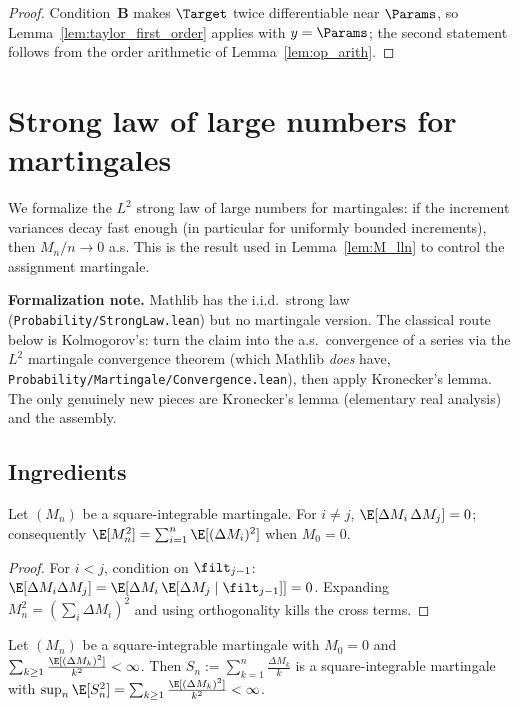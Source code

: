 \begin{proof}
Condition~\textbf{B} makes $\Target$ twice differentiable near $\Params$, so
Lemma~\ref{lem:taylor_first_order} applies with $y = \Params$; the second
statement follows from the order arithmetic of Lemma~\ref{lem:op_arith}.
\end{proof}


\chapter{Strong law of large numbers for martingales}
\label{chap:pre_slln}

We formalize the $L^2$ strong law of large numbers for martingales: if the
increment variances decay fast enough (in particular for uniformly bounded
increments), then $M_n / n \to 0$ a.s. This is the result used in
Lemma~\ref{lem:M_lln} to control the assignment martingale.

\textbf{Formalization note.} Mathlib has the i.i.d.\ strong law
(\texttt{Probability/StrongLaw.lean}) but no martingale version. The classical
route below is Kolmogorov's: turn the claim into the a.s.\ convergence of a
series via the $L^2$ martingale convergence theorem (which Mathlib \emph{does}
have, \texttt{Probability/Martingale/Convergence.lean}), then apply Kronecker's
lemma. The only genuinely new pieces are Kronecker's lemma (elementary real
analysis) and the assembly.

\section{Ingredients}
\label{sec:pre_slln_ingredients}

\begin{lemma}\label{lem:slln_orthogonal}
Let $(M_n)$ be a square-integrable martingale. For $i \ne j$,
$\E[\Delta M_i\, \Delta M_j] = 0$; consequently
$\E[M_n^2] = \sum_{i=1}^n \E[(\Delta M_i)^2]$ when $M_0 = 0$.
\end{lemma}

\begin{proof}
For $i < j$, condition on $\filt_{j-1}$: $\E[\Delta M_i \Delta M_j]
= \E[\Delta M_i\, \E[\Delta M_j\mid\filt_{j-1}]] = 0$. Expanding
$M_n^2 = (\sum_i \Delta M_i)^2$ and using orthogonality kills the cross terms.
\end{proof}

\begin{lemma}\label{lem:slln_weighted}
Let $(M_n)$ be a square-integrable martingale with $M_0=0$ and
$\sum_{k\ge1}\frac{\E[(\Delta M_k)^2]}{k^2} < \infty$. Then
$S_n := \sum_{k=1}^n \frac{\Delta M_k}{k}$ is a square-integrable martingale with
$\sup_n \E[S_n^2] = \sum_{k\ge1}\frac{\E[(\Delta M_k)^2]}{k^2} < \infty$.
\end{lemma}

